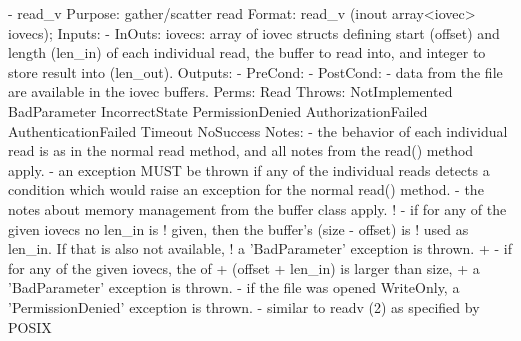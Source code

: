 \begin{myspec}
    - read_v
      Purpose:  gather/scatter read
      Format:   read_v             (inout array<iovec> iovecs);
      Inputs:   -
      InOuts:   iovecs:             array of iovec structs
                                    defining start (offset) and
                                    length (len_in) of each
                                    individual read, the buffer
                                    to read into, and integer 
                                    to store result into
                                    (len_out).
      Outputs:  -
      PreCond:  -
      PostCond: - data from the file are available in the
                  iovec buffers.
      Perms:    Read
      Throws:   NotImplemented
                BadParameter
                IncorrectState
                PermissionDenied
                AuthorizationFailed
                AuthenticationFailed
                Timeout
                NoSuccess
      Notes:    - the behavior of each individual read is as
                  in the normal read method, and all notes from
                  the read() method apply.
                - an exception MUST be thrown if any of the
                  individual reads detects a condition which
                  would raise an exception for the normal
                  read() method.
                - the notes about memory management from the
                  buffer class apply.
!               - if for any of the given iovecs no len_in is
!                 given, then the buffer's (size - offset) is 
!                 used as len_in.  If that is also not available,
!                 a 'BadParameter' exception is thrown.
+               - if for any of the given iovecs, the of 
+                 (offset + len_in) is larger than size,  
+                 a 'BadParameter' exception is thrown.
                - if the file was opened WriteOnly, a
                  'PermissionDenied' exception is thrown.
                - similar to readv (2) as specified by POSIX
 

\end{myspec}
